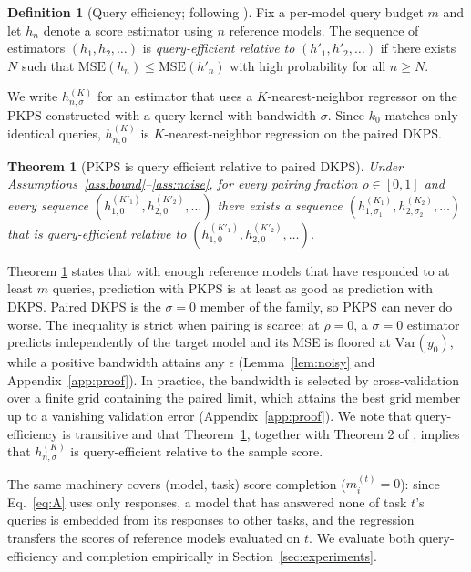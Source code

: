 \documentclass{article}
\newtheorem{theorem}{Theorem}
\theoremstyle{definition}
\newtheorem{definition}{Definition}
\theoremstyle{remark}
\theoremstyle{plain}
\newcommand{\PKPS}{PKPS\xspace}
\begin{document}
\begin{definition}[Query efficiency; following \citealp{dkps_qeff}]
\label{def:qeff}
Fix a per-model query budget $m$ and let $h_n$ denote a score estimator using $n$ reference models.
The sequence of estimators $(h_{1}, h_{2}, \hdots)$ is \emph{query-efficient relative to} $(h'_{1}, h'_{2}, \hdots )$ if there exists $N$ such that
$\mathrm{MSE}(h_n)\le\mathrm{MSE}(h'_n)$ with high probability for all $n\ge N$.
\end{definition}
We write $h_{n,\sigma}^{(K)}$ for an estimator that uses a $K$-nearest-neighbor
regressor on the \PKPS constructed with a query kernel with bandwidth $\sigma$.
Since $k_{0}$ matches only identical queries, $h_{n,0}^{(K)}$ is $K$-nearest-neighbor
regression on the paired DKPS.
\begin{theorem}[\PKPS is query efficient relative to paired DKPS]
\label{thm:qeff}
Under Assumptions~\ref{ass:bound}--\ref{ass:noise}, for every pairing fraction
$\rho\in[0,1]$ and every sequence
$(h_{1,0}^{(K'_{1})}, h_{2,0}^{(K'_{2})}, \hdots)$ there exists a sequence
$(h_{1,\sigma_{1}}^{(K_{1})}, h_{2,\sigma_{2}}^{(K_{2})}, \hdots)$ that is query-efficient relative to
$(h_{1,0}^{(K'_{1})}, h_{2,0}^{(K'_{2})}, \hdots)$.
\end{theorem}

Theorem \ref{thm:qeff} states that with enough reference models that have responded to at least $ m $ queries, prediction with \PKPS is at least as good as prediction with DKPS.
Paired DKPS is the $\sigma=0$ member of the family, so \PKPS can never do worse.
The inequality is strict when pairing is scarce: at
$\rho=0$, a $\sigma=0$ estimator predicts independently of the target model and its MSE
is floored at $\mathrm{Var}(y_{0})$, while a positive bandwidth attains any $\epsilon$
(Lemma~\ref{lem:noisy} and Appendix~\ref{app:proof}).
In practice, the bandwidth is selected by cross-validation over a finite grid containing
the paired limit, which attains the best grid member up to a vanishing validation error
(Appendix~\ref{app:proof}).
We note that query-efficiency is transitive and that Theorem~\ref{thm:qeff}, together with
Theorem 2 of \citet{dkps_qeff}, implies that $ h_{n,\sigma}^{(K)} $ is query-efficient relative to the sample score.

The same machinery covers (model, task) score completion ($m_i^{(t)}=0$): since
Eq.~\eqref{eq:A} uses only responses, a model that has answered none of task $t$'s
queries is embedded from its responses to other tasks, and the regression transfers
the scores of reference models evaluated on $t$.
We evaluate both query-efficiency and completion empirically in Section~\ref{sec:experiments}.
\end{document}
